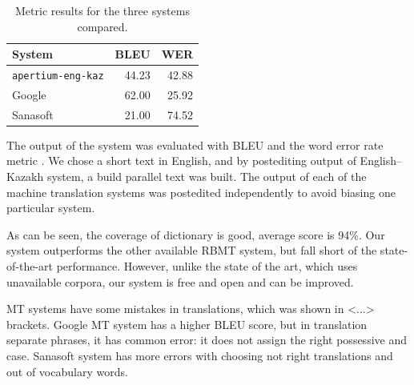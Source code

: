 \documentclass[11pt]{article}
\begin{document}
\begin{table}
  \centering
  \begin{tabular}{|l|r|r|}
    \hline
    \textbf{System} & \textbf{BLEU} & \textbf{WER} \\
    \hline
    \texttt{apertium-eng-kaz} & 44.23 & 42.88 \\
    Google & 62.00 & 25.92 \\
    Sanasoft & 21.00 & 74.52 \\
    \hline
  \end{tabular}
  \caption{Metric results for the three systems compared.}
  \label{table:metrics}
\end{table}

The output of the system was evaluated with BLEU \citep{papineni02} and the word error rate 
metric \citep{levenshtein/1966}. We chose a short text in English, and by postediting output 
of English--Kazakh system, a build parallel text was built. The output of each of the machine
translation systems was postedited independently to avoid biasing one particular system.

As can be seen, the coverage of dictionary is good, average score is 94\%. Our system outperforms the other 
available RBMT system, but fall short of the state-of-the-art performance. However, unlike the state of 
the art, which uses unavailable corpora, our system is free and open and can be improved.

MT systems have some mistakes in translations, which was shown in <...> brackets. Google MT system 
has a higher BLEU score, but in translation separate phrases, it has common error: it does not assign 
the right possessive and case. Sanasoft system has more errors with choosing not right translations 
and out of vocabulary words.
\end{document}
